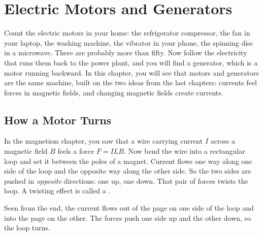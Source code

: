 \chapter{Electric Motors and Generators}

Count the electric motors in your home: the refrigerator compressor, the
fan in your laptop, the washing machine, the vibrator in your phone, the
spinning disc in a microwave. There are probably more than fifty. Now
follow the electricity that runs them back to the power plant, and you will
find a generator, which is a motor running backward. In this chapter, you
will see that motors and generators are the same machine, built on the two
ideas from the last chapters: currents feel forces in magnetic fields, and
changing magnetic fields create currents.

\section{How a Motor Turns}

In the magnetism chapter, you saw that a wire carrying current $I$ across a
magnetic field $B$ feels a force $F = ILB$. Now bend the wire into a
rectangular loop and set it between the poles of a magnet. Current flows
one way along one side of the loop and the opposite way along the other
side. So the two sides are pushed in \emph{opposite} directions: one up,
one down. That pair of forces twists the loop. A twisting effect is called
a .

\begin{center}

Seen from the end, the current flows out of the page on one side of the
loop and into the page on the other. The forces push one side up and the
other down, so the loop turns.
\end{center}

